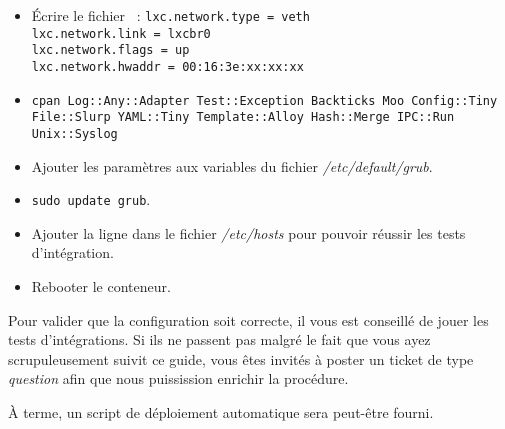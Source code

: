 \begin{itemize}
	\item Écrire le fichier ~:
		{\tt{}lxc.network.type = veth\\
lxc.network.link = lxcbr0\\
lxc.network.flags = up\\
lxc.network.hwaddr = 00:16:3e:xx:xx:xx}
	\item {\tt cpan Log::Any::Adapter Test::Exception Backticks Moo Config::Tiny File::Slurp YAML::Tiny Template::Alloy Hash::Merge IPC::Run Unix::Syslog}
	\item Ajouter les paramètres  aux variables  du fichier \emph{/etc/default/grub}.
	\item {\tt sudo update grub}.
	\item Ajouter la ligne  dans le fichier \emph{/etc/hosts} pour pouvoir réussir les tests d'intégration.
	\item Rebooter le conteneur.
\end{itemize}

Pour valider que la configuration soit correcte, il vous est conseillé de jouer les tests d'intégrations.
Si ils ne passent pas malgré le fait que vous ayez scrupuleusement suivit ce guide, vous êtes invités à poster un ticket de type \emph{question} afin que nous puissission enrichir la procédure.

À terme, un script de déploiement automatique sera peut-être fourni.


